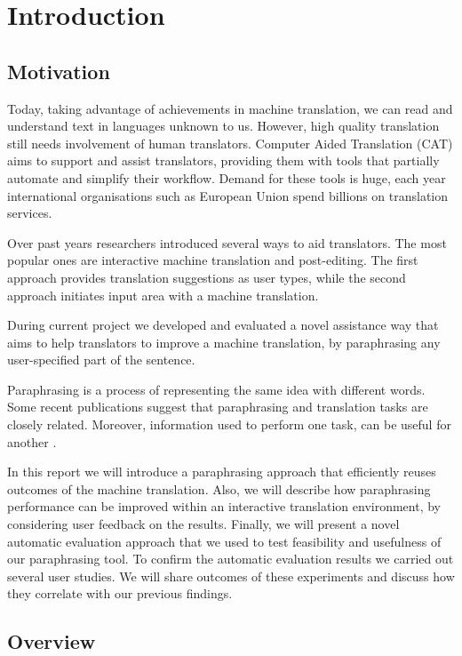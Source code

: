 \chapter{Introduction}
  
\section{Motivation}

Today, taking advantage of achievements in machine translation, we can read and understand text in languages unknown to us. However, high quality translation still needs involvement of human translators. Computer Aided Translation (CAT) aims to support and assist translators, providing them with tools that partially automate and simplify their workflow. Demand for these tools is huge, each year international organisations such as European Union spend billions on translation services. 

Over past years researchers introduced several ways to aid translators. The most popular ones are interactive machine translation and post-editing. The first approach provides translation suggestions as user types, while the second approach initiates input area with a machine translation. 

During current project we developed and evaluated a novel assistance way that aims to help translators to improve a machine translation, by paraphrasing any user-specified part of the sentence.

Paraphrasing is a process of representing the same idea with different words. Some recent publications suggest that paraphrasing and translation tasks are closely related. Moreover, information used to perform one task, can be useful for another \cite{Callison-Burch2007}. 

In this report we will introduce a paraphrasing approach that efficiently reuses outcomes of the machine translation. Also, we will describe how paraphrasing performance can be improved within an interactive translation environment, by considering user feedback on the results. Finally, we will present a novel automatic evaluation approach that we used to test feasibility and usefulness of our paraphrasing tool. To confirm the automatic evaluation results we carried out several user studies. We will share outcomes of these experiments and discuss how they correlate with our previous findings. 

\section{Overview}

